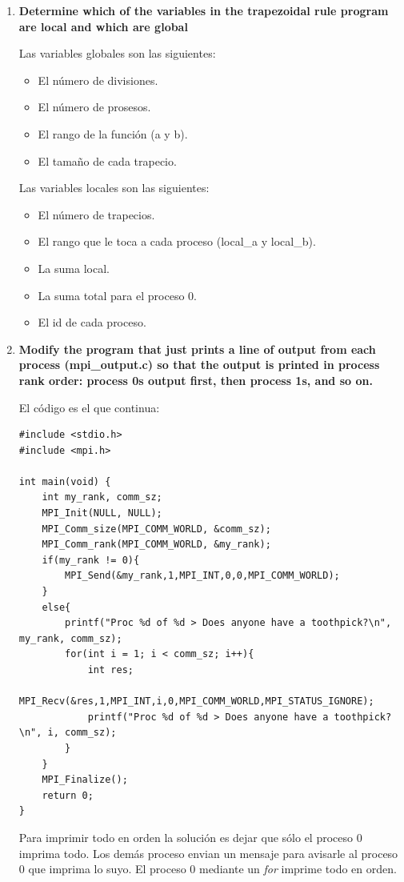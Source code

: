 \documentclass[a4paper,12pt]{article}
\begin{document}
\begin{enumerate}
\item \textbf{Determine which of the variables in the trapezoidal rule program are local and which are global}

Las variables globales son las siguientes:

\begin{itemize}
 \item El número de divisiones.
 \item El número de prosesos.
 \item El rango de la función (a y b).
 \item El tamaño de cada trapecio.
\end{itemize}

Las variables locales son las siguientes:

\begin{itemize}
 \item El número de trapecios.
 \item El rango que le toca a cada proceso (local\_a y local\_b).
 \item La suma local.
 \item La suma total para el proceso 0.
 \item El id de cada proceso.
\end{itemize}

\item \textbf{Modify the program that just prints a line of output from each process (mpi\_output.c) so that the output 
is printed in process rank order: process 0s output first, then process 1s, and so on.}

El código es el que continua:

\begin{lstlisting}
#include <stdio.h>
#include <mpi.h>

int main(void) {
	int my_rank, comm_sz;
	MPI_Init(NULL, NULL);
	MPI_Comm_size(MPI_COMM_WORLD, &comm_sz);
	MPI_Comm_rank(MPI_COMM_WORLD, &my_rank);
	if(my_rank != 0){
		MPI_Send(&my_rank,1,MPI_INT,0,0,MPI_COMM_WORLD);
	}
	else{
		printf("Proc %d of %d > Does anyone have a toothpick?\n", my_rank, comm_sz);	
		for(int i = 1; i < comm_sz; i++){
			int res;
			MPI_Recv(&res,1,MPI_INT,i,0,MPI_COMM_WORLD,MPI_STATUS_IGNORE);
			printf("Proc %d of %d > Does anyone have a toothpick?\n", i, comm_sz);
		}
	}
	MPI_Finalize();
	return 0;
}
\end{lstlisting}

Para imprimir todo en orden la solución es dejar que sólo el proceso 0 imprima todo. Los demás proceso envian un mensaje
para avisarle al proceso 0 que imprima lo suyo. El proceso 0 mediante un \textit{for} imprime todo en orden. 


\end{enumerate}
\end{document}
